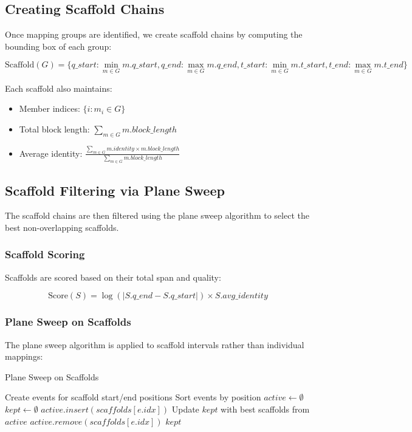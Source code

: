 \documentclass[11pt]{article}
\begin{document}
\subsection{Creating Scaffold Chains}

Once mapping groups are identified, we create scaffold chains by computing the bounding box of each group:

\begin{equation}
\text{Scaffold}(G) = \{
    q\_start: \min_{m \in G} m.q\_start,
    q\_end: \max_{m \in G} m.q\_end,
    t\_start: \min_{m \in G} m.t\_start,
    t\_end: \max_{m \in G} m.t\_end
\}
\end{equation}

Each scaffold also maintains:
\begin{itemize}
    \item Member indices: $\{i : m_i \in G\}$
    \item Total block length: $\sum_{m \in G} m.block\_length$
    \item Average identity: $\frac{\sum_{m \in G} m.identity \times m.block\_length}{\sum_{m \in G} m.block\_length}$
\end{itemize}

\subsection{Scaffold Filtering via Plane Sweep}

The scaffold chains are then filtered using the plane sweep algorithm to select the best non-overlapping scaffolds.

\subsubsection{Scaffold Scoring}

Scaffolds are scored based on their total span and quality:

\begin{equation}
\text{Score}(S) = \log(|S.q\_end - S.q\_start|) \times S.avg\_identity
\end{equation}

\subsubsection{Plane Sweep on Scaffolds}

The plane sweep algorithm is applied to scaffold intervals rather than individual mappings:

\begin{algorithm}
\caption{Plane Sweep on Scaffolds}
\begin{algorithmic}[1]
\STATE Create events for scaffold start/end positions
\STATE Sort events by position
\STATE $active \gets \emptyset$ 
\STATE $kept \gets \emptyset$
        \STATE $active.insert(scaffolds[e.idx])$
        \STATE Update $kept$ with best scaffolds from $active$
    \ELSE
        \STATE $active.remove(scaffolds[e.idx])$
    \ENDIF
\ENDFOR
\RETURN $kept$
\end{algorithmic}
\end{algorithm}
\end{document}
